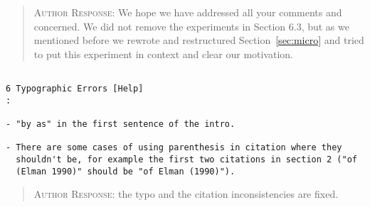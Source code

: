 \begin{quote}
\textsc{Author Response:}  We hope we have addressed all your comments and concerned. We did not remove the experiments in Section 6.3, but as we mentioned before we rewrote and restructured Section~\ref{sec:micro} and tried to put this experiment in context and clear our motivation.
\end{quote}
\begin{verbatim}

6 Typographic Errors [Help]
:

- "by as" in the first sentence of the intro.

- There are some cases of using parenthesis in citation where they
  shouldn't be, for example the first two citations in section 2 ("of
  (Elman 1990)" should be "of Elman (1990)").

\end{verbatim}  
\begin{quote}
\textsc{Author Response:} the typo and the citation inconsistencies are fixed.
\end{quote}
